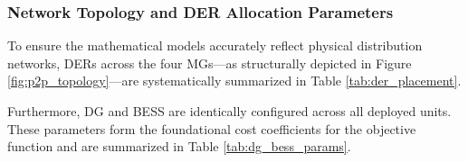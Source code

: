 \subsubsection{Network Topology and DER Allocation Parameters}
To ensure the mathematical models accurately reflect physical distribution networks, DERs across the four MGs---as structurally depicted in Figure \ref{fig:p2p_topology}---are systematically summarized in Table \ref{tab:der_placement}.

\begin{table}[htbp]
    \centering
    \caption{Placement of DERs across MGs}
    \label{tab:der_placement}
\end{table}

Furthermore, DG and BESS are identically configured across all deployed units. These parameters form the foundational cost coefficients for the objective function and are summarized in Table \ref{tab:dg_bess_params}.

